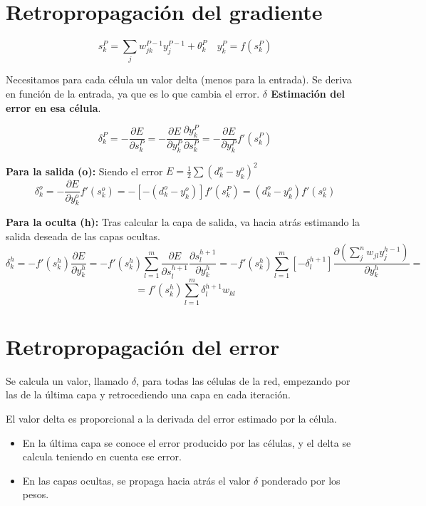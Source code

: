 \documentclass[12pt, twoside, openright]{report} %
\begin{document}
\section{Retropropagación del gradiente}

$$s^P_k= \sum_j w^{P-1}_{jk}y^{P-1}_j+\theta_k^P \quad y^P_k=f(s^P_k)$$

Necesitamos para cada célula un valor delta (menos para la entrada). Se deriva en función de la entrada, ya que es lo que cambia el error. \textbf{$\delta$ Estimación del error en esa célula}.

$$\delta^P_k=-\frac{\partial E}{\partial s^P_k}=-\frac{\partial E}{\partial y^P_k}\frac{\partial y^P_k}{\partial s^P_k}=-\frac{\partial E}{\partial y^P_k}f'(s^P_k)$$

\textbf{Para la salida (o):} Siendo el error $E=\frac 1 2 \sum (d^o_k-y^o_k)^2$
$$\delta^o_k=-\frac{\partial E}{\partial y^o_k}f'(s^o_k)=-[-(d^o_k-y^o_k)]f'(s^P_k)=(d^o_k-y^o_k)f'(s^o_k)$$

\textbf{Para la oculta (h):} Tras calcular la capa de salida, va hacia atrás estimando la salida deseada de las capas ocultas.
$$\delta^h_k=-f'(s^h_k)\frac{\partial E}{\partial y^h_k}=-f'(s^h_k)\sum^{m}_{l=1}\frac{\partial E}{\partial s^{h+1}_l}\frac{\partial s^{h+1}_l}{\partial y^h_k}=-f'(s^h_k)\sum^{m}_{l=1}[-\delta^{h+1}_l]\frac{\partial (\sum_j^n w_{jl}y^{h-1}_j)}{\partial y^h_k}=$$ $$=f'(s^h_k)\sum^{m}_{l=1}\delta^{h+1}_l w_{kl}$$
\pagebreak

\section{Retropropagación del error}
Se calcula un valor, llamado $\delta$, para todas las células de la red, empezando por las de la última capa y retrocediendo una capa en cada iteración.

El valor delta es proporcional a la derivada del error estimado por la célula.
\begin{itemize}
	\item En la última capa se conoce el error producido por las células, y el delta se calcula teniendo en cuenta ese error.
	\item En las capas ocultas, se propaga hacia atrás el valor $\delta$ ponderado por los pesos.
\end{itemize}
\end{document}
